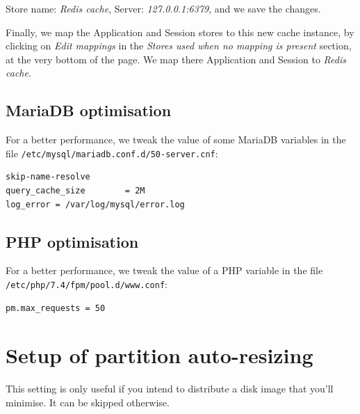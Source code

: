 \documentclass[12pt]{article}
\begin{document}
Store name: \emph{Redis cache}, Server: \emph{127.0.0.1:6379}, and we save the changes.

Finally, we map the Application and Session stores to this new cache instance, by clicking on \emph{Edit mappings} in the \emph{Stores used when no mapping is present} section, at the very bottom of the page.
We map there Application and Session to \emph{Redis cache}.

\subsection{MariaDB optimisation}

For a better performance, we tweak the value of some MariaDB variables in the file \lstinline{/etc/mysql/mariadb.conf.d/50-server.cnf}:
\begin{lstlisting}[language=bash]
skip-name-resolve
query_cache_size        = 2M
log_error = /var/log/mysql/error.log
\end{lstlisting}

\subsection{PHP optimisation}

For a better performance, we tweak the value of a PHP variable in the file \lstinline{/etc/php/7.4/fpm/pool.d/www.conf}:
\begin{lstlisting}[language=bash]
pm.max_requests = 50
\end{lstlisting}

\section{Setup of partition auto-resizing}

This setting is only useful if you intend to distribute a disk image that you'll minimise.
It can be skipped otherwise.
\end{document}
